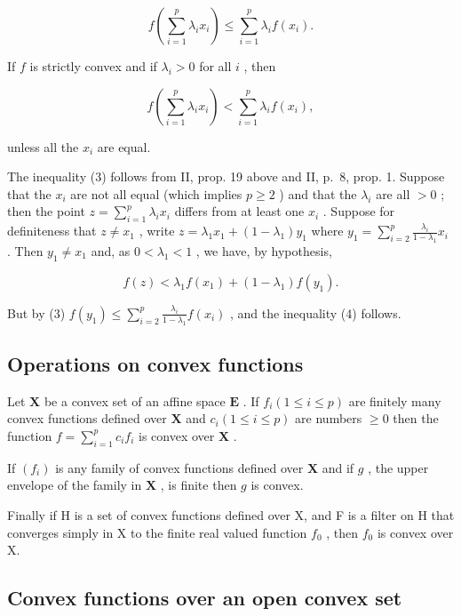 \[
f \left(\sum_ {i = 1} ^ {p} \lambda_ {i} x _ {i}\right) \leqslant \sum_ {i = 1} ^ {p} \lambda_ {i} f \left(x _ {i}\right).\tag{3}
\]

If \(f\) is strictly convex and if \(\lambda_i > 0\) for all \(i\) , then

\[
f \left(\sum_ {i = 1} ^ {p} \lambda_ {i} x _ {i}\right) <   \sum_ {i = 1} ^ {p} \lambda_ {i} f \left(x _ {i}\right),\tag{4}
\]

unless all the \(x_{i}\) are equal.

The inequality (3) follows from II, prop. 19 above and II, p.~8, prop. 1. Suppose that the \(x_{i}\) are not all equal (which implies \(p \geqslant 2\) ) and that the \(\lambda_{i}\) are all \(>0\) ; then the point \(z = \sum_{i=1}^{p} \lambda_{i} x_{i}\) differs from at least one \(x_{i}\) . Suppose for definiteness that \(z \neq x_{1}\) , write \(z = \lambda_{1} x_{1} + (1 - \lambda_{1}) y_{1}\) where \(y_{1} = \sum_{i=2}^{p} \frac{\lambda_{i}}{1 - \lambda_{1}} x_{i}\) . Then \(y_{1} \neq x_{1}\) and, as \(0 < \lambda_{1} < 1\) , we have, by hypothesis,

\[
f (z) <   \lambda_ {1} f (x _ {1}) + (1 - \lambda_ {1}) f (y _ {1}).
\]

But by (3) \(f(y_{1}) \leqslant \sum_{i=2}^{p} \frac{\lambda_{i}}{1 - \lambda_{1}} f(x_{i})\) , and the inequality (4) follows.

\subsection{Operations on convex functions}

Let \(\mathbf{X}\) be a convex set of an affine space \(\mathbf{E}\) . If \(f_{i}(1 \leqslant i \leqslant p)\) are finitely many convex functions defined over \(\mathbf{X}\) and \(c_{i} (1 \leqslant i \leqslant p)\) are numbers \(\geqslant 0\) then the function \(f = \sum_{i=1}^{p} c_{i} f_{i}\) is convex over \(\mathbf{X}\) .

If \((f_{i})\) is any family of convex functions defined over \(\mathbf{X}\) and if \(g\) , the upper envelope of the family in \(\mathbf{X}\) , is finite then \(g\) is convex.

Finally if H is a set of convex functions defined over X, and F is a filter on H that converges simply in X to the finite real valued function \(f_{0}\) , then \(f_{0}\) is convex over X.

\subsection{Convex functions over an open convex set}

